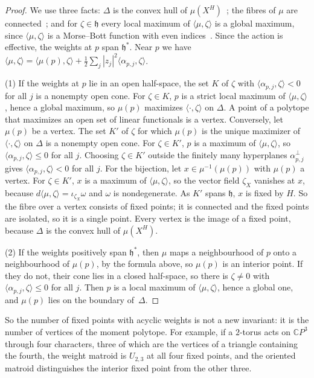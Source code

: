 \documentclass[11pt,a4paper]{article}
\numberwithin{equation}{section}
\theoremstyle{plain}
\theoremstyle{definition}
\theoremstyle{remark}
\newcommand{\C}{\mathbb{C}}
\begin{document}
\begin{proof}
We use three facts: $\Delta$ is the convex hull of $\mu(X^H)$~\cite{Ati82,GS82}; the fibres of $\mu$ are connected~\cite{Ati82}; and for $\zeta\in\mathfrak h$ every local maximum of $\langle\mu,\zeta\rangle$ is a global maximum, since $\langle\mu,\zeta\rangle$ is a Morse--Bott function with even indices~\cite{Ati82}. Since the action is effective, the weights at $p$ span $\mathfrak h^*$. Near $p$ we have $\langle\mu,\zeta\rangle=\langle\mu(p),\zeta\rangle+\frac12\sum_j|z_j|^2\langle\alpha_{p,j},\zeta\rangle$.

(1) If the weights at $p$ lie in an open half-space, the set $K$ of $\zeta$ with $\langle\alpha_{p,j},\zeta\rangle<0$ for all $j$ is a nonempty open cone. For $\zeta\in K$, $p$ is a strict local maximum of $\langle\mu,\zeta\rangle$, hence a global maximum, so $\mu(p)$ maximizes $\langle\cdot,\zeta\rangle$ on $\Delta$. A point of a polytope that maximizes an open set of linear functionals is a vertex. Conversely, let $\mu(p)$ be a vertex. The set $K'$ of $\zeta$ for which $\mu(p)$ is the unique maximizer of $\langle\cdot,\zeta\rangle$ on $\Delta$ is a nonempty open cone. For $\zeta\in K'$, $p$ is a maximum of $\langle\mu,\zeta\rangle$, so $\langle\alpha_{p,j},\zeta\rangle\leqslant0$ for all $j$. Choosing $\zeta\in K'$ outside the finitely many hyperplanes $\alpha_{p,j}^\perp$ gives $\langle\alpha_{p,j},\zeta\rangle<0$ for all $j$. For the bijection, let $x\in\mu^{-1}(\mu(p))$ with $\mu(p)$ a vertex. For $\zeta\in K'$, $x$ is a maximum of $\langle\mu,\zeta\rangle$, so the vector field $\zeta_X$ vanishes at $x$, because $d\langle\mu,\zeta\rangle=\iota_{\zeta_X}\omega$ and $\omega$ is nondegenerate. As $K'$ spans $\mathfrak h$, $x$ is fixed by $H$. So the fibre over a vertex consists of fixed points; it is connected and the fixed points are isolated, so it is a single point. Every vertex is the image of a fixed point, because $\Delta$ is the convex hull of $\mu(X^H)$.

(2) If the weights positively span $\mathfrak h^*$, then $\mu$ maps a neighbourhood of $p$ onto a neighbourhood of $\mu(p)$, by the formula above, so $\mu(p)$ is an interior point. If they do not, their cone lies in a closed half-space, so there is $\zeta\neq0$ with $\langle\alpha_{p,j},\zeta\rangle\leqslant0$ for all $j$. Then $p$ is a local maximum of $\langle\mu,\zeta\rangle$, hence a global one, and $\mu(p)$ lies on the boundary of~$\Delta$.
\end{proof}

So the number of fixed points with acyclic weights is not a new invariant: it is the number of vertices of the moment polytope. For example, if a $2$-torus acts on $\C P^3$ through four characters, three of which are the vertices of a triangle containing the fourth, the weight matroid is $U_{2,3}$ at all four fixed points, and the oriented matroid distinguishes the interior fixed point from the other three.
\end{document}
